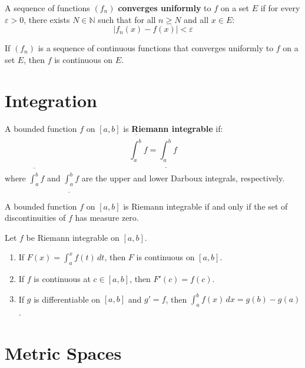 \begin{definition}
A sequence of functions $(f_n)$ \textbf{converges uniformly} to $f$ on a set $E$ if for every $\varepsilon > 0$, there exists $N \in \mathbb{N}$ such that for all $n \geq N$ and all $x \in E$:
\[|f_n(x) - f(x)| < \varepsilon\]
\end{definition}

\begin{theorem}
If $(f_n)$ is a sequence of continuous functions that converges uniformly to $f$ on a set $E$, then $f$ is continuous on $E$.
\end{theorem}

\section{Integration}

\begin{definition}
A bounded function $f$ on $[a,b]$ is \textbf{Riemann integrable} if:
\[\overline{\int_a^b} f = \underline{\int_a^b} f\]
where $\overline{\int_a^b} f$ and $\underline{\int_a^b} f$ are the upper and lower Darboux integrals, respectively.
\end{definition}

\begin{theorem}
A bounded function $f$ on $[a,b]$ is Riemann integrable if and only if the set of discontinuities of $f$ has measure zero.
\end{theorem}

\begin{theorem}
Let $f$ be Riemann integrable on $[a,b]$.
\begin{enumerate}
    \item If $F(x) = \int_a^x f(t) \, dt$, then $F$ is continuous on $[a,b]$.
    \item If $f$ is continuous at $c \in [a,b]$, then $F'(c) = f(c)$.
    \item If $g$ is differentiable on $[a,b]$ and $g' = f$, then $\int_a^b f(x) \, dx = g(b) - g(a)$.
\end{enumerate}
\end{theorem}

\section{Metric Spaces}

